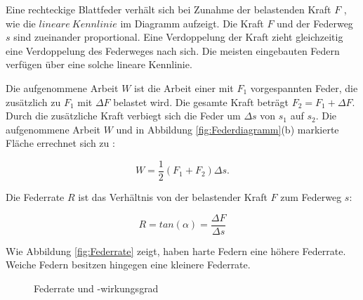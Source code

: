 Eine rechteckige Blattfeder verhält sich bei Zunahme der belastenden Kraft $F$ , wie die $lineare~Kennlinie$ im Diagramm aufzeigt. Die Kraft $F$ und der Federweg $s$ sind zueinander proportional. Eine Verdoppelung der Kraft zieht gleichzeitig eine Verdoppelung des Federweges nach sich. Die meisten eingebauten Federn verfügen über eine solche lineare Kennlinie. 

Die aufgenommene Arbeit $W$ ist die Arbeit einer mit $F_1$ vorgespannten Feder, die zusätzlich zu $F_1$ mit $\Delta F$ belastet wird. Die gesamte Kraft beträgt $F_2 = F_1 + \Delta F$. Durch die zusätzliche Kraft verbiegt sich die Feder um $\Delta s$ von $s_1$ auf $s_2$. Die aufgenommene Arbeit $W$ und in Abbildung \ref{fig:Federdiagramm}(b) markierte Fläche errechnet sich zu :

\begin{equation}
W = \frac{1}{2} (F_1 + F_2) \Delta s.
\label{Federarbeit}
\end{equation}


Die Federrate $R$ ist das Verhältnis von der belastender Kraft $F$ zum Federweg $s$:

\begin{equation}
R = tan (\alpha)= \frac{\Delta F}{\Delta s}
\label{eq:Federrate}
\end{equation}


Wie Abbildung \ref{fig:Federrate} zeigt, haben harte Federn eine höhere Federrate. Weiche Federn besitzen hingegen eine kleinere Federrate. 


\begin{figure}[htb]
\centering
{}
\caption{Federrate und -wirkungsgrad}
\label{fig:Federrate und -wirkungsgrad}
\end{figure}


